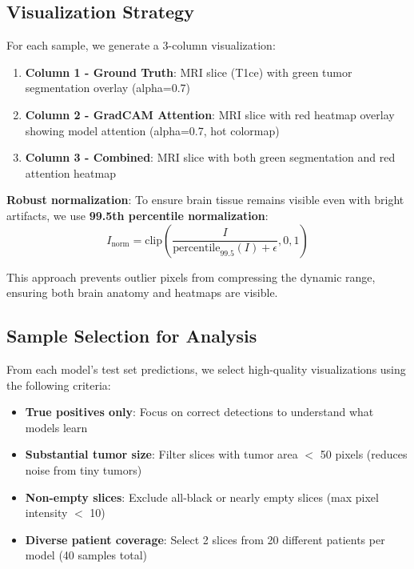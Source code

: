 \subsection{Visualization Strategy}

For each sample, we generate a 3-column visualization:

\begin{enumerate}
    \item \textbf{Column 1 - Ground Truth}: MRI slice (T1ce) with green tumor segmentation overlay (alpha=0.7)
    \item \textbf{Column 2 - GradCAM Attention}: MRI slice with red heatmap overlay showing model attention (alpha=0.7, hot colormap)
    \item \textbf{Column 3 - Combined}: MRI slice with both green segmentation and red attention heatmap
\end{enumerate}

\textbf{Robust normalization}: To ensure brain tissue remains visible even with bright artifacts, we use \textbf{99.5th percentile normalization}:
\begin{equation}
I_{\text{norm}} = \text{clip}\left(\frac{I}{\text{percentile}_{99.5}(I) + \epsilon}, 0, 1\right)
\end{equation}

This approach prevents outlier pixels from compressing the dynamic range, ensuring both brain anatomy and heatmaps are visible.

\subsection{Sample Selection for Analysis}

From each model's test set predictions, we select high-quality visualizations using the following criteria:

\begin{itemize}
    \item \textbf{True positives only}: Focus on correct detections to understand what models learn
    \item \textbf{Substantial tumor size}: Filter slices with tumor area $<$ 50 pixels (reduces noise from tiny tumors)
    \item \textbf{Non-empty slices}: Exclude all-black or nearly empty slices (max pixel intensity $<$ 10)
    \item \textbf{Diverse patient coverage}: Select 2 slices from 20 different patients per model (40 samples total)
\end{itemize}


